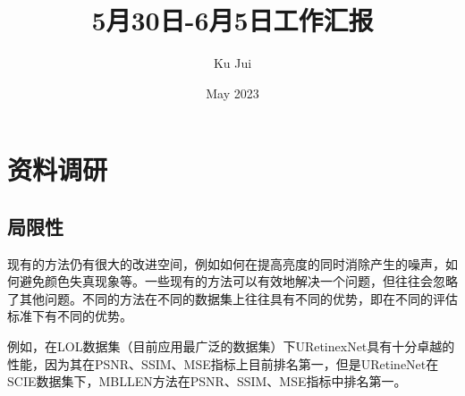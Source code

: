 \documentclass[letterpaper,12pt]{article}
\begin{document}
	
	
	\title{\songti {}5月30日-6月5日工作汇报}
	\author{\textrm{Ku Jui}}
	\date{\textrm{May 2023}}
	\maketitle
	
	\renewcommand{\figurename}{Figure} %
	\renewcommand{\contentsname}{Contents}
	\renewcommand{\tablename}{Table}
	\tableofcontents  %
	
	\section{资料调研}
	
		\subsection{局限性}
	
			现有的方法仍有很大的改进空间，例如如何在提高亮度的同时消除产生的噪声，如何避免颜色失真现象等。一些现有的方法可以有效地解决一个问题，但往往会忽略了其他问题。不同的方法在不同的数据集上往往具有不同的优势，即在不同的评估标准下有不同的优势。
			
			例如，在LOL数据集（目前应用最广泛的数据集）下URetinexNet具有十分卓越的性能，因为其在PSNR、SSIM、MSE指标上目前排名第一，但是URetineNet在SCIE数据集下，MBLLEN方法在PSNR、SSIM、MSE指标中排名第一。
			
\end{document}
